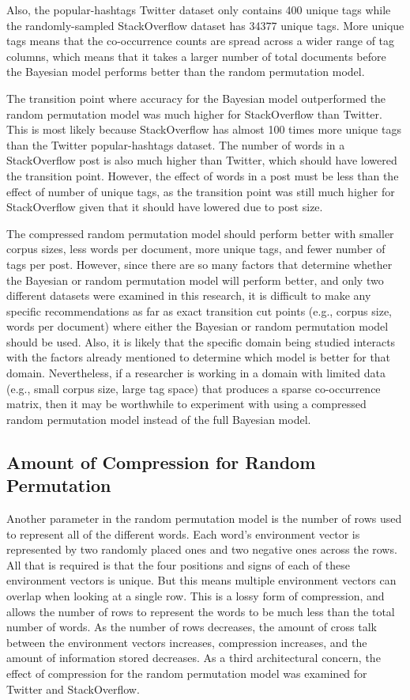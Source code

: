 \documentclass[man,floatsintext,donotrepeattitle]{apa6}
\begin{document}
Also, the popular-hashtags Twitter dataset only contains 400 unique tags while the randomly-sampled StackOverflow dataset has \num{34377} unique tags.
More unique tags means that the co-occurrence counts are spread across a wider range of tag columns,
which means that it takes a larger number of total documents before the Bayesian model performs better than the random permutation model.

The transition point where accuracy for the Bayesian model outperformed the random permutation model was much higher for StackOverflow than Twitter.
This is most likely because StackOverflow has almost \num{100} times more unique tags than the Twitter popular-hashtags dataset.
The number of words in a StackOverflow post is also much higher than Twitter, which should have lowered the transition point.
However, the effect of words in a post must be less than the effect of number of unique tags, as the transition point was still much higher for StackOverflow given that it should have lowered due to post size.

The compressed random permutation model should perform better with smaller corpus sizes, less words per document, more unique tags, and fewer number of tags per post.
However, since there are so many factors that determine whether the Bayesian or random permutation model will perform better,
and only two different datasets were examined in this research,
it is difficult to make any specific recommendations as far as exact transition cut points (e.g., corpus size, words per document) where either the Bayesian or random permutation model should be used.
Also, it is likely that the specific domain being studied interacts with the factors already mentioned to determine which model is better for that domain.
Nevertheless, if a researcher is working in a domain with limited data (e.g., small corpus size, large tag space) that produces a sparse co-occurrence matrix,
then it may be worthwhile to experiment with using a compressed random permutation model instead of the full Bayesian model.

\subsection{Amount of Compression for Random Permutation}

Another parameter in the random permutation model is the number of rows used to represent all of the different words.
Each word's environment vector is represented by two randomly placed ones and two negative ones across the rows.
All that is required is that the four positions and signs of each of these environment vectors is unique.
But this means multiple environment vectors can overlap when looking at a single row.
This is a lossy form of compression, and allows the number of rows to represent the words to be much less than the total number of words.
As the number of rows decreases, the amount of cross talk between the environment vectors increases, compression increases, and the amount of information stored decreases.
As a third architectural concern, the effect of compression for the random permutation model was examined for Twitter and StackOverflow.
\end{document}
